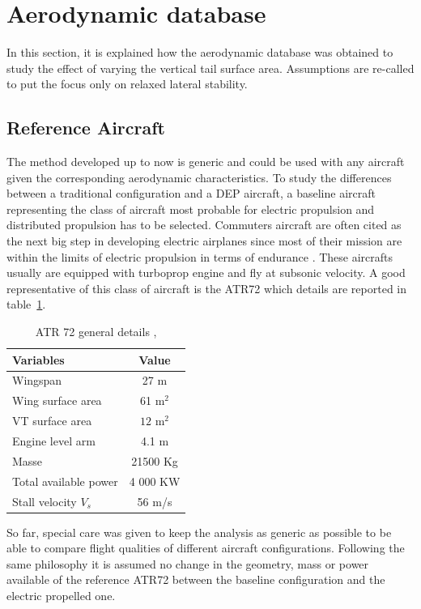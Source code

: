 \section{Aerodynamic database}
In this section, it is explained how the aerodynamic database was obtained to study the effect of varying the vertical tail surface area. Assumptions are re-called to put the focus only on relaxed lateral stability.

\subsection{Reference Aircraft}
The method developed up to now is generic and could be used with any aircraft given the corresponding aerodynamic characteristics. To study the differences between a traditional configuration and a DEP aircraft, a baseline aircraft representing the class of aircraft most probable for electric propulsion and distributed propulsion has to be selected. Commuters aircraft are often cited as the next big step in developing electric airplanes since most of their mission are within the limits of electric propulsion in terms of endurance \cite{MisconceptionMoore} \cite{StucklMethodsDesignElectriProp}. These aircrafts usually are equipped with turboprop engine and fly at subsonic velocity. A good representative of this class of aircraft is the ATR72 which details are reported in table~\ref{tab:nominalset}.

\begin{table}[hbt!]
	\caption{\label{tab:nominalset} ATR 72 general details \cite{ATRFAAtypecertificate}, \cite{JanesAircraft}}
	\centering
	\begin{tabular}{l|c}
		Variables & Value\\
		\hline
		Wingspan & 27 m\\
		Wing surface area & 61 m$^2$\\ 
		VT surface area & $12$ $\textrm{m}^2$\\
		Engine level arm & 4.1 m\\
		Masse & 21500 Kg\\
		Total available power & 4 000 KW\\
		Stall velocity $V_s$ & 56 m/s\\
	\end{tabular}
\end{table}

So far, special care was given to keep the analysis as generic as possible to be able to compare flight qualities of different aircraft configurations. Following the same philosophy it is assumed no change in the geometry, mass or power available of the reference ATR72 between the baseline configuration and the electric propelled one.

